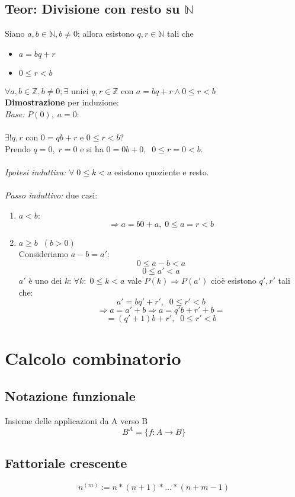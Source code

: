 \subsection{Teor: Divisione con resto su \(\mathbb{N}\)} 
Siano \(a,b\in\mathbb{N}, b\neq 0\); allora esistono \(q, r\in\mathbb{N}\) tali che
\begin{itemize}
    \item \(a=bq+r\)
    \item \(0\leq r<b\)
\end{itemize}
\(\forall a,b\in\mathbb{Z}, b\neq 0; \exists\) unici \(q, r\in\mathbb{Z}\) con \(a=bq+r \land 0\leq r<b\)
\\\textbf{Dimostrazione} per induzione:
\\\textit{Base:} $P(0),\; a=0$:
\\\\$\exists !q,r$ con $0=qb+r$ e $0\leq r <b$?
\\Prendo $q=0,\; r=0$ e si ha $0=0b+0,\;\;0\leq r=0<b$.
\\\\\textit{Ipotesi induttiva:} $\forall\; 0\leq k<a$ esistono quoziente e resto.
\\\\\textit{Passo induttivo:} due casi:
\begin{enumerate}
  
\item $a<b$:
  \[\Rightarrow a=b0+a,\; 0\leq a=r<b\]

\item $a\geq b\;\;(b>0)$
  \\Consideriamo $a-b=a'$:
  \[0\leq a-b<a\]
  \[0\leq a' <a\]
  $a'$ è uno dei $k$: $\forall k: \; 0\leq k<a$ vale $P(k)\Rightarrow P(a')$ cioè esistono $q', r'$ tali che:
  \[a'=bq'+r',\;\;0\leq r'<b\]
  \[\Rightarrow a=a'+b\Rightarrow a=q'b+r'+b=\]
  \[=(q'+1)b+r',\;\;0\leq r'<b\]
\end{enumerate}

\section{Calcolo combinatorio}

\subsection{Notazione funzionale} 
Insieme delle applicazioni da A verso B
\[B^A=\{f:A\rightarrow B\}\]

\subsection{Fattoriale crescente} 
\[n^{(m)}:= n\ast (n+1)\ast ... \ast (n+m-1)\]


